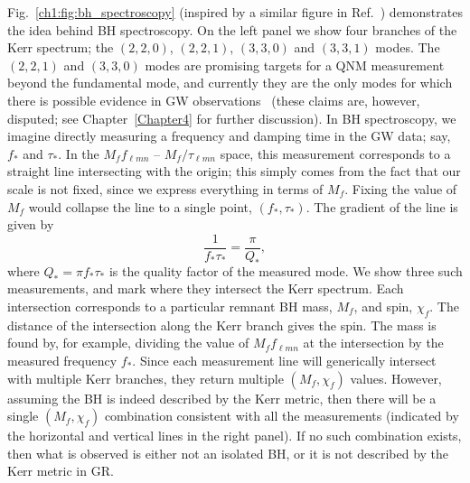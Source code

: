 Fig.~\ref{ch1:fig:bh_spectroscopy} (inspired by a similar figure in Ref.~\cite{Dreyer:2003bv}) demonstrates the idea behind BH spectroscopy.
On the left panel we show four branches of the Kerr spectrum; the $(2,2,0)$, $(2,2,1)$, $(3,3,0)$ and $(3,3,1)$ modes.
The $(2,2,1)$ and $(3,3,0)$ modes are promising targets for a QNM measurement beyond the fundamental mode, and currently they are the only modes for which there is possible evidence in GW observations~\cite{Isi:2019aib, Capano:2021etf} (these claims are, however, disputed; see Chapter~\ref{Chapter4} for further discussion).
In BH spectroscopy, we imagine directly measuring a frequency and damping time in the GW data; say, $f_*$ and $\tau_*$.
In the $M_f f_{\ell m n}$ -- $M_f/\tau_{\ell m n}$ space, this measurement corresponds to a straight line intersecting with the origin; this simply comes from the fact that our scale is not fixed, since we express everything in terms of $M_f$. 
Fixing the value of $M_f$ would collapse the line to a single point, $(f_*,\tau_*)$.
The gradient of the line is given by
\begin{equation}
    \frac{1}{f_* \tau_*} = \frac{\pi}{Q_*},
\end{equation}
where $Q_* = \pi f_* \tau_*$ is the quality factor of the measured mode.
We show three such measurements, and mark where they intersect the Kerr spectrum.
Each intersection corresponds to a particular remnant BH mass, $M_f$, and spin, $\chi_f$. 
The distance of the intersection along the Kerr branch gives the spin.
The mass is found by, for example, dividing the value of $M_f f_{\ell m n}$ at the intersection by the measured frequency $f_*$.
Since each measurement line will generically intersect with multiple Kerr branches, they return multiple $(M_f, \chi_f)$ values. 
However, assuming the BH is indeed described by the Kerr metric, then there will be a single $(M_f,\chi_f)$ combination consistent with all the measurements (indicated by the horizontal and vertical lines in the right panel).
If no such combination exists, then what is observed is either not an isolated BH, or it is not described by the Kerr metric in GR. 


